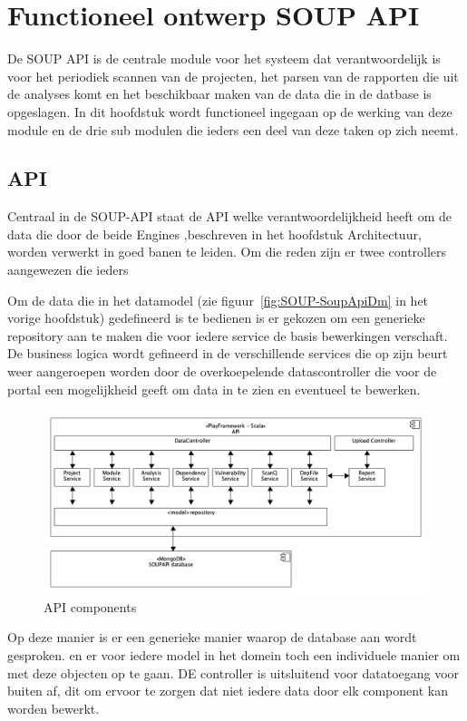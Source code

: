 \chapter{Functioneel ontwerp SOUP API}\label{ch:impl soup api}
De SOUP API is de centrale module voor het systeem dat verantwoordelijk is voor het periodiek scannen van de projecten, het parsen van de rapporten die uit de analyses komt en het beschikbaar maken van de data die in de datbase is opgeslagen. In dit hoofdstuk wordt functioneel ingegaan op de werking van deze module en de drie sub modulen die ieders een deel van deze taken op zich neemt.


\section{API}\label{sec:api}
Centraal in de SOUP-API staat de API welke verantwoordelijkheid heeft om de data die door de beide Engines ,beschreven in het hoofdstuk Architectuur, worden verwerkt in goed banen te leiden. Om die reden zijn er twee controllers aangewezen die ieders

Om de data die in het datamodel (zie figuur~\ref{fig:SOUP-SoupApiDm} in het vorige hoofdstuk) gedefineerd is te bedienen is er gekozen om een generieke repository aan te maken die voor iedere service de basis bewerkingen verschaft. De business logica wordt gefineerd in de verschillende services die op zijn beurt weer aangeroepen worden door de overkoepelende datascontroller die voor de portal een mogelijkheid geeft om data in te zien en eventueel te bewerken.
\begin{figure}[bth]
    \myfloatalign
    \includegraphics[width=12cm]{gfx/umlet/exports/API-ComponentsDiagram}
    \caption{API components }
    \label{fig:API components}
\end{figure}

Op deze manier is er een generieke manier waarop de database aan wordt gesproken. en er voor iedere model in het domein toch een individuele manier om met deze objecten op te gaan. DE controller is uitsluitend voor datatoegang voor buiten af, dit om ervoor te zorgen dat niet iedere data door elk component kan worden bewerkt.


